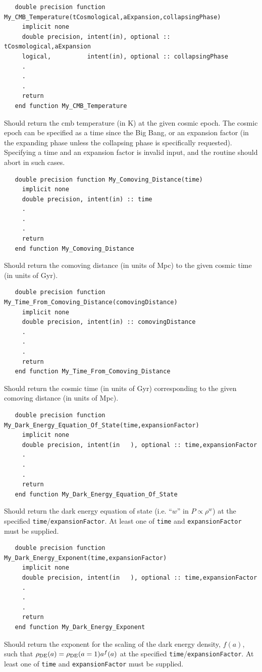 \begin{verbatim}
   double precision function My_CMB_Temperature(tCosmological,aExpansion,collapsingPhase)
     implicit none
     double precision, intent(in), optional :: tCosmological,aExpansion
     logical,          intent(in), optional :: collapsingPhase
     .
     .
     .
     return
   end function My_CMB_Temperature
\end{verbatim}
Should return the \gls{cmb} temperature (in K) at the given cosmic epoch. The cosmic epoch can be specified as a time since the Big Bang, or an expansion factor (in the expanding phase unless the collapsing phase is specifically requested). Specifying a time and an expansion factor is invalid input, and the routine should abort in such cases.

\begin{verbatim}
   double precision function My_Comoving_Distance(time)
     implicit none
     double precision, intent(in) :: time
     .
     .
     .
     return
   end function My_Comoving_Distance
\end{verbatim}
Should return the comoving distance (in units of Mpc) to the given cosmic time (in units of Gyr).

\begin{verbatim}
   double precision function My_Time_From_Comoving_Distance(comovingDistance)
     implicit none
     double precision, intent(in) :: comovingDistance
     .
     .
     .
     return
   end function My_Time_From_Comoving_Distance
\end{verbatim}
Should return the cosmic time (in units of Gyr) corresponding to the given comoving distance (in units of Mpc).

\begin{verbatim}
   double precision function My_Dark_Energy_Equation_Of_State(time,expansionFactor)
     implicit none
     double precision, intent(in   ), optional :: time,expansionFactor
     .
     .
     .
     return
   end function My_Dark_Energy_Equation_Of_State
\end{verbatim}
Should return the dark energy equation of state (i.e. ``$w$'' in $P\propto \rho^w$) at the specified {\tt time}/{\tt expansionFactor}. At least one of {\tt time} and {\tt expansionFactor} must be supplied.

\begin{verbatim}
   double precision function My_Dark_Energy_Exponent(time,expansionFactor)
     implicit none
     double precision, intent(in   ), optional :: time,expansionFactor
     .
     .
     .
     return
   end function My_Dark_Energy_Exponent
\end{verbatim}
Should return the exponent for the scaling of the dark energy density, $f(a)$, such that $\rho_{\rm DE}(a) = \rho_{\rm DE}(a=1) a^f(a)$ at the specified {\tt time}/{\tt expansionFactor}. At least one of {\tt time} and {\tt expansionFactor} must be supplied.

